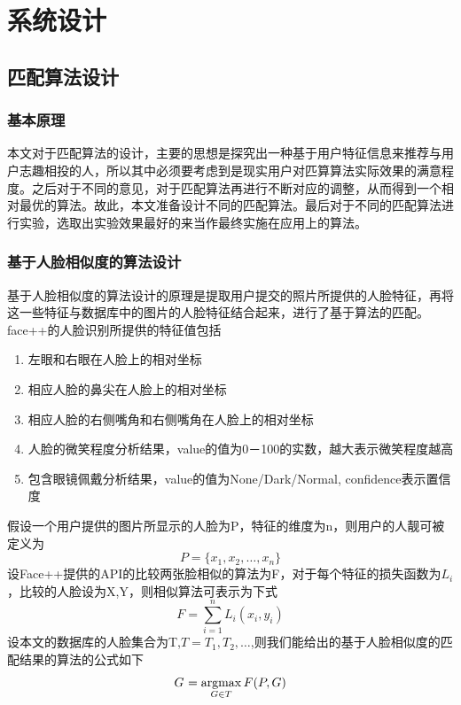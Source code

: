 
\chapter{系统设计}

\section{匹配算法设计}

\subsection{基本原理}
本文对于匹配算法的设计，主要的思想是探究出一种基于用户特征信息来推荐与用户志趣相投的人，所以其中必须要考虑到是现实用户对匹算算法实际效果的满意程度。之后对于不同的意见，对于匹配算法再进行不断对应的调整，从而得到一个相对最优的算法。故此，本文准备设计不同的匹配算法。最后对于不同的匹配算法进行实验，选取出实验效果最好的来当作最终实施在应用上的算法。
\subsection{基于人脸相似度的算法设计}

基于人脸相似度的算法设计的原理是提取用户提交的照片所提供的人脸特征，再将这一些特征与数据库中的图片的人脸特征结合起来，进行了基于算法的匹配。
face++的人脸识别所提供的特征值包括
\begin{enumerate}
\item 左眼和右眼在人脸上的相对坐标
\item 相应人脸的鼻尖在人脸上的相对坐标
\item 相应人脸的右侧嘴角和右侧嘴角在人脸上的相对坐标
\item 人脸的微笑程度分析结果，value的值为0－100的实数，越大表示微笑程度越高
\item 包含眼镜佩戴分析结果，value的值为None/Dark/Normal, confidence表示置信度
\end{enumerate}
假设一个用户提供的图片所显示的人脸为P，特征的维度为n，则用户的人靓可被定义为
\begin{equation*}
P=\{x_1,x_2,\ldots,x_n\}
\end{equation*}
设Face++提供的API的比较两张脸相似的算法为F，对于每个特征的损失函数为$L_i$，比较的人脸设为X,Y，则相似算法可表示为下式
\begin{equation*}
F=\sum_{i=1}^n L_i(x_i, y_i)
\end{equation*}
设本文的数据库的人脸集合为T,$T={T_1,T_2,\ldots}$,则我们能给出的基于人脸相似度的匹配结果的算法的公式如下
\begin{equation*}
G^{\*} = \mathop{\argmax_{G \in T}}{F(P,G)}
\end{equation*}

